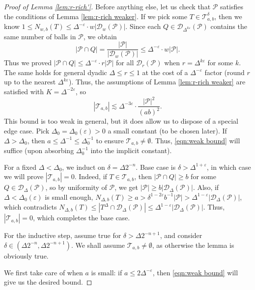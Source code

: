 \documentclass{amsart}
\newcommand{\T}{\mathcal{T}}
\newcommand{\eps}{\varepsilon}
\newcommand{\lesim}{\lesssim}
\newcommand{\cD}{\mathcal{D}}
\newcommand{\cT}{\mathcal{T}}
\newcommand{\cP}{\mathcal{P}}
\begin{document}
\begin{proof}[Proof of Lemma \ref{lem:r-rich'}]
    Before anything else, let us check that $\cP$ satisfies the conditions of Lemma \ref{lem:r-rich weaker}. If we pick some $T\in \cT_{a,b}^\delta$, then we know $1\leq N_{w,b}(T)\leq \Delta^{-\eps} \cdot w|\cD_w(\cP)|$. Since each $Q\in \cD_{\Delta^{k\eps}}(\cP)$ contains the same number of balls in $\cP$, we obtain
    \begin{equation*}
        |\cP \cap Q| = \frac{|\cP|}{|\cD_w (\cP)|} \le \Delta^{-\eps} \cdot w |\cP|.
    \end{equation*}
    Thus we proved $|\cP \cap Q| \le \Delta^{-\eps} \cdot r |\cP|$ for all $\cD_r (\cP)$ when $r = \Delta^{k\eps}$ for some $k$. The same holds for general dyadic $\Delta \le r \le 1$ at the cost of a $\Delta^{-\eps}$ factor (round $r$ up to the nearest $\Delta^{k\eps}$). Thus, the assumptions of Lemma \ref{lem:r-rich weaker} are satisfied with $K = \Delta^{-2\eps}$, so
    \begin{equation}\label{eqn:weak bound}
        |\T_{a,b}| \lesim \Delta^{-3\eps} \cdot \frac{|\cP|^2}{(ab)^2}.
    \end{equation}
    This bound is too weak in general, but it does allow us to dispose of a special edge case. Pick $\Delta_0 = \Delta_0 (\eps) > 0$ a small constant (to be chosen later). If $\Delta > \Delta_0$, then $a \le \Delta^{-1} \le \Delta_0^{-1}$ to ensure $\T_{a,b} \neq \emptyset$. Thus, \eqref{eqn:weak bound} will suffice (upon absorbing $\Delta_0^{-1}$ into the implicit constant).

    For a fixed $\Delta < \Delta_0$, we induct on $\delta = \Delta 2^{-n}$. Base case is $\delta > \Delta^{1+\eps}$, in which case we will prove $|\T_{a,b}| = 0$. Indeed, if $T \in \T_{a,b}$, then $|\cP \cap Q| \ge b$ for some $Q \in \cD_\Delta (\cP)$, so by uniformity of $\cP$, we get $|\cP| \ge b |\cD_\Delta (\cP)|$. Also, if $\Delta < \Delta_0 (\eps)$ is small enough, $N_{\Delta, b} (T) \ge a > \delta^{1-2\eps} b^{-1} |\cP| > \Delta^{1-\eps} |\cD_\Delta (\cP)|$, which contradicts $N_{\Delta, b} (T)  \le |T^{\Delta}\cap \cD_{\Delta}(\cP)|\le \Delta^{1-\eps} |\cD_\Delta (\cP)|$. Thus, $|\T_{a,b}| = 0$, which completes the base case.

    For the inductive step, assume true for $\delta > \Delta 2^{-n+1}$, and consider $\delta \in (\Delta 2^{-n}, \Delta 2^{-n+1})$. We shall assume $\T_{a,b} \neq \emptyset$, as otherwise the lemma is obviously true.
    
    We first take care of when $a$ is small: if $a \le 2\Delta^{-\eps}$, then \eqref{eqn:weak bound} will give us the desired bound.
    

\end{proof}
\end{document}
